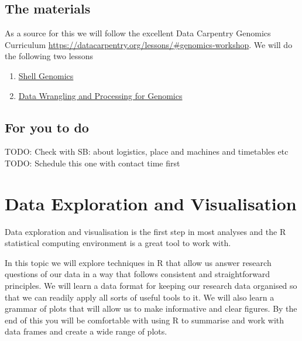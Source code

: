 \documentclass[
]{book}
\providecommand{\tightlist}{%
  \setlength{\itemsep}{0pt}\setlength{\parskip}{0pt}}
\begin{document}
\hypertarget{the-materials}{%
\section{The materials}\label{the-materials}}

As a source for this we will follow the excellent Data Carpentry Genomics Curriculum \url{https://datacarpentry.org/lessons/\#genomics-workshop}. We will do the following two lessons

\begin{enumerate}
\def\labelenumi{\arabic{enumi}.}
\tightlist
\item
  \href{https://datacarpentry.org/lessons/\#genomics-workshop}{Shell Genomics}
\item
  \href{https://datacarpentry.org/wrangling-genomics/}{Data Wrangling and Processing for Genomics}
\end{enumerate}

\hypertarget{for-you-to-do}{%
\section{For you to do}\label{for-you-to-do}}

TODO: Check with SB: about logistics, place and machines and timetables etc
TODO: Schedule this one with contact time first

\hypertarget{data-exploration-and-visualisation}{%
\chapter{Data Exploration and Visualisation}\label{data-exploration-and-visualisation}}

Data exploration and visualisation is the first step in most analyses and the R statistical computing environment is a great tool to work with.

In this topic we will explore techniques in R that allow us answer research questions of our data in a way that follows consistent and straightforward principles. We will learn a data format for keeping our research data organised so that we can readily apply all sorts of useful tools to it. We will also learn a grammar of plots that will allow us to make informative and clear figures. By the end of this you will be comfortable with using R to summarise and work with data frames and create a wide range of plots.
\end{document}
